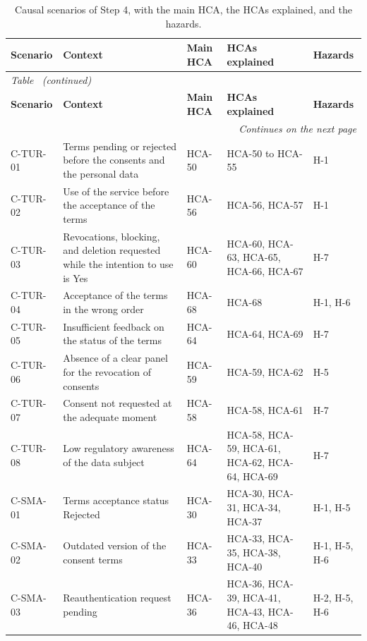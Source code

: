 \begin{longtable}{l p{} l p{} p{}}
    \caption[Causal scenarios of Step 4]{Causal scenarios of Step 4, with the main HCA, the HCAs explained, and the hazards.}
    \label{tab:cenarios} \\
    \hline
    \textbf{Scenario} & \textbf{Context} & \textbf{Main HCA} & \textbf{HCAs explained} & \textbf{Hazards} \\
    \hline
    \endfirsthead
    \multicolumn{5}{l}{\small\emph{Table~\thetable{} (continued)}} \\
    \hline
    \textbf{Scenario} & \textbf{Context} & \textbf{Main HCA} & \textbf{HCAs explained} & \textbf{Hazards} \\
    \hline
    \endhead
    \hline
    \multicolumn{5}{r}{\small\emph{Continues on the next page}} \\
    \endfoot
    \hline
    \endlastfoot
        C-TUR-01 & Terms pending or rejected before the consents and the personal data & HCA-50 & HCA-50 to HCA-55 & H-1 \\
        C-TUR-02 & Use of the service before the acceptance of the terms & HCA-56 & HCA-56, HCA-57 & H-1 \\
        C-TUR-03 & Revocations, blocking, and deletion requested while the intention to use is Yes & HCA-60 & HCA-60, HCA-63, HCA-65, HCA-66, HCA-67 & H-7 \\
        C-TUR-04 & Acceptance of the terms in the wrong order & HCA-68 & HCA-68 & H-1, H-6 \\
        C-TUR-05 & Insufficient feedback on the status of the terms & HCA-64 & HCA-64, HCA-69 & H-7 \\
        C-TUR-06 & Absence of a clear panel for the revocation of consents & HCA-59 & HCA-59, HCA-62 & H-5 \\
        C-TUR-07 & Consent not requested at the adequate moment & HCA-58 & HCA-58, HCA-61 & H-7 \\
        C-TUR-08 & Low regulatory awareness of the data subject & HCA-64 & HCA-58, HCA-59, HCA-61, HCA-62, HCA-64, HCA-69 & H-7 \\
        C-SMA-01 & Terms acceptance status Rejected & HCA-30 & HCA-30, HCA-31, HCA-34, HCA-37 & H-1, H-5 \\
        C-SMA-02 & Outdated version of the consent terms & HCA-33 & HCA-33, HCA-35, HCA-38, HCA-40 & H-1, H-5, H-6 \\
        C-SMA-03 & Reauthentication request pending & HCA-36 & HCA-36, HCA-39, HCA-41, HCA-43, HCA-46, HCA-48 & H-2, H-5, H-6 \\

\end{longtable}
